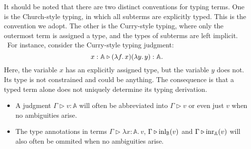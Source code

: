 \begin{example}
It should be noted that there are two distinct conventions for typing terms. One is the Church-style typing, in which all subterms are explicitly typed. This is the convention we adopt. The other is the Curry-style typing, where only the outermost term is assigned a type, and the types of subterms are left implicit.  For instance, consider the Curry-style typing judgment:
\[
x : \mathbb{A} \triangleright (\lambda f.\,x)(\lambda y.\,y) : \mathbb{A}.
\]
Here, the variable $x$ has an explicitly assigned type, but the variable $y$ does not. Its type is not constrained and could be anything. The consequence is that a typed term alone does not uniquely determine its typing derivation.

\begin{convention}
  \begin{itemize}
    \item A judgment $\Gamma \triangleright v: \mathbb{A}$ will often be abbreviated into $\Gamma \triangleright v $ or even just $v$ when no ambiguities arise.
    \item The type annotations in terms $\Gamma \triangleright \lambda x:\mathbb{A} . \, v$, $\Gamma \triangleright \mathrm{inl}_{\mathbb{B}}(v)$ and $\Gamma \triangleright \mathrm{inr}_{\mathbb{A}}(v)$ will also often be ommited when no ambiguities arise.
  \end{itemize}
\end{convention}




\end{example}

